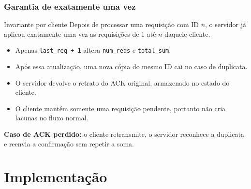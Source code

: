 \documentclass{beamer}
\begin{document}
\begin{frame}
  \frametitle{Garantia de exatamente uma vez}
  \begin{block}{Invariante por cliente}
    Depois de processar uma requisição com ID $n$, o servidor já aplicou exatamente uma vez as requisições de 1 até $n$ daquele cliente.
  \end{block}

  \begin{itemize}
    \item Apenas \texttt{last\_req + 1} altera \texttt{num\_reqs} e \texttt{total\_sum}.
    \item Após essa atualização, uma nova cópia do mesmo ID cai no caso de duplicata.
    \item O servidor devolve o retrato do ACK original, armazenado no estado do cliente.
    \item O cliente mantém somente uma requisição pendente, portanto não cria lacunas no fluxo normal.
  \end{itemize}

  \vspace{0.5em}
  \textbf{Caso de ACK perdido:} o cliente retransmite, o servidor reconhece a duplicata e reenvia a confirmação sem repetir a soma.
\end{frame}

\section{Implementação}
\end{document}
